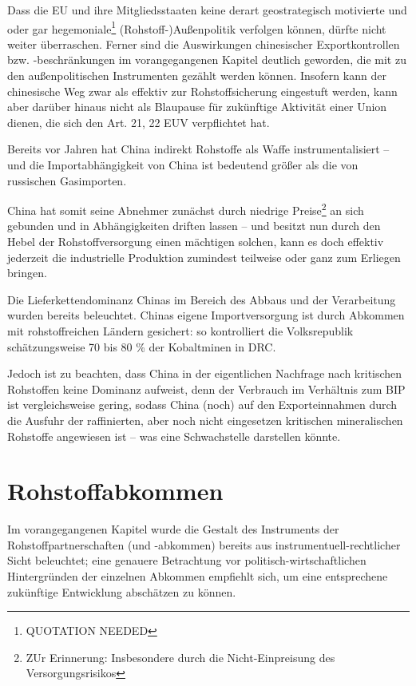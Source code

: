 \documentclass[12pt,a4paper,oneside]{book} %
\begin{document}

Dass die EU und ihre Mitgliedsstaaten keine derart geostrategisch motivierte und oder gar hegemoniale\footnote{QUOTATION NEEDED} (Rohstoff-)Außenpolitik verfolgen können, dürfte nicht weiter überraschen. Ferner sind die Auswirkungen chinesischer Exportkontrollen bzw. -beschränkungen im vorangegangenen Kapitel deutlich geworden, die mit zu den außenpolitischen Instrumenten gezählt werden können. Insofern kann der chinesische Weg zwar als effektiv zur Rohstoffsicherung eingestuft werden, kann aber darüber hinaus nicht als Blaupause für zukünftige Aktivität einer Union dienen, die sich den Art. 21, 22 EUV verpflichtet hat.

Bereits vor Jahren hat China indirekt Rohstoffe als Waffe instrumentalisiert -- und die Importabhängigkeit von China ist bedeutend größer als die von russischen Gasimporten.\autocite{BDI. Rohstoffkongress: Deutschland braucht eine strategische Rohstoffpolitik}

China hat somit seine Abnehmer zunächst durch niedrige Preise\footnote{ZUr Erinnerung: Insbesondere durch die Nicht-Einpreisung des Versorgungsrisikos} an sich gebunden und in Abhängigkeiten driften lassen -- und besitzt nun durch den Hebel der Rohstoffversorgung einen mächtigen solchen, kann es doch effektiv jederzeit die industrielle Produktion zumindest teilweise oder ganz zum Erliegen bringen.

Die Lieferkettendominanz Chinas im Bereich des Abbaus und der Verarbeitung wurden bereits beleuchtet. Chinas eigene Importversorgung ist durch Abkommen mit rohstoffreichen Ländern gesichert: so kontrolliert die Volksrepublik schätzungsweise 70 bis 80 \% der Kobaltminen in DRC.

Jedoch ist zu beachten, dass China in der eigentlichen Nachfrage nach kritischen Rohstoffen keine Dominanz aufweist, denn der Verbrauch im Verhältnis zum BIP ist vergleichsweise gering, sodass China (noch) auf den Exporteinnahmen durch die Ausfuhr der raffinierten, aber noch nicht eingesetzen kritischen mineralischen Rohstoffe angewiesen ist -- was eine Schwachstelle darstellen könnte.


\section{Rohstoffabkommen}
Im vorangegangenen Kapitel wurde die Gestalt des Instruments der Rohstoffpartnerschaften (und -abkommen) bereits aus instrumentuell-rechtlicher Sicht beleuchtet; eine genauere Betrachtung vor politisch-wirtschaftlichen Hintergründen der einzelnen Abkommen empfiehlt sich, um eine entsprechene zukünftige Entwicklung abschätzen zu können.
\end{document}
